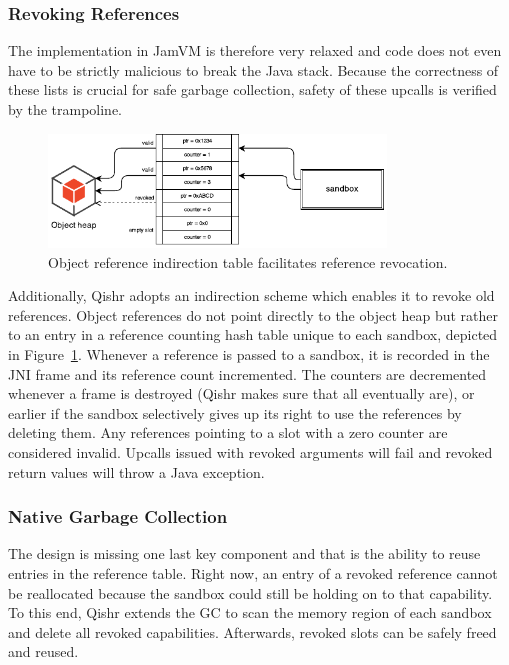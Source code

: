 \documentclass[a4paper,12pt,twoside,openright]{report}
\begin{document}
\subsubsection{Revoking References}

The implementation in JamVM is therefore very relaxed and code does not even have to be strictly malicious to break the Java stack. Because the correctness of these lists is crucial for safe garbage collection, safety of these upcalls is verified by the trampoline.

\begin{figure}
	\centering
	\includegraphics[width=0.8\textwidth]{dia_indirection_table.pdf}
	\caption{Object reference indirection table facilitates reference revocation.}
	\label{fig:IndirectionTable}
\end{figure}

Additionally, Qishr adopts an indirection scheme which enables it to revoke old references. Object references do not point directly to the object heap but rather to an entry in a reference counting hash table unique to each sandbox, depicted in Figure~\ref{fig:IndirectionTable}. Whenever a reference is passed to a sandbox, it is recorded in the JNI frame and its reference count incremented. The counters are decremented whenever a frame is destroyed (Qishr makes sure that all eventually are), or earlier if the sandbox selectively gives up its right to use the references by deleting them. Any references pointing to a slot with a zero counter are considered invalid. Upcalls issued with revoked arguments will fail and revoked return values will throw a Java exception.

\subsubsection{Native Garbage Collection}

The design is missing one last key component and that is the ability to reuse entries in the reference table. Right now, an entry of a revoked reference cannot be reallocated because the sandbox could still be holding on to that capability. To this end, Qishr extends the GC to scan the memory region of each sandbox and delete all revoked capabilities. Afterwards, revoked slots can be safely freed and reused.
\end{document}
